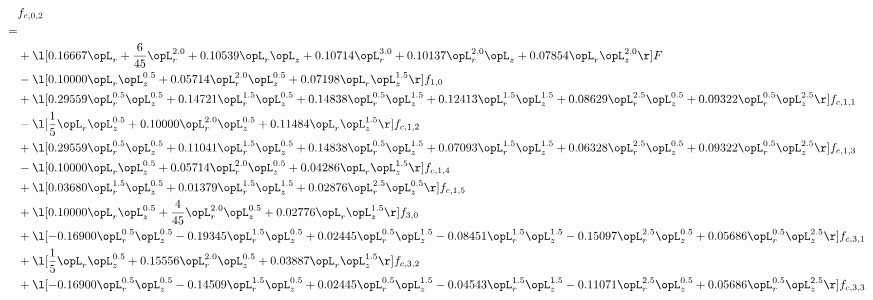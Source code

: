 \begin{alignat}{2} 
\label{eq:f_02_2} 
& f_{c,0,2} \nonumber \\ 
 = \\ 
& + \l[  0.16667 \opL_r + \frac{6}{45} \opL_r^{2.0} +  0.10539 \opL_r \opL_z +  0.10714 \opL_r^{3.0} +  0.10137 \opL_r^{2.0} \opL_z +  0.07854 \opL_r \opL_z^{2.0}  \r] F \nonumber \\ 
& - \l[  0.10000 \opL_r \opL_z^{0.5} +  0.05714 \opL_r^{2.0} \opL_z^{0.5} +  0.07198 \opL_r \opL_z^{1.5}  \r] f_{1,0} \nonumber \\ 
& + \l[  0.29559 \opL_r^{0.5} \opL_z^{0.5} +  0.14721 \opL_r^{1.5} \opL_z^{0.5} +  0.14838 \opL_r^{0.5} \opL_z^{1.5} +  0.12413 \opL_r^{1.5} \opL_z^{1.5} +  0.08629 \opL_r^{2.5} \opL_z^{0.5} +  0.09322 \opL_r^{0.5} \opL_z^{2.5}  \r] f_{c,1,1} \nonumber \\ 
& - \l[ \frac{1}{5} \opL_r \opL_z^{0.5} +  0.10000 \opL_r^{2.0} \opL_z^{0.5} +  0.11484 \opL_r \opL_z^{1.5}  \r] f_{c,1,2} \nonumber \\ 
& + \l[  0.29559 \opL_r^{0.5} \opL_z^{0.5} +  0.11041 \opL_r^{1.5} \opL_z^{0.5} +  0.14838 \opL_r^{0.5} \opL_z^{1.5} +  0.07093 \opL_r^{1.5} \opL_z^{1.5} +  0.06328 \opL_r^{2.5} \opL_z^{0.5} +  0.09322 \opL_r^{0.5} \opL_z^{2.5}  \r] f_{c,1,3} \nonumber \\ 
& - \l[  0.10000 \opL_r \opL_z^{0.5} +  0.05714 \opL_r^{2.0} \opL_z^{0.5} +  0.04286 \opL_r \opL_z^{1.5}  \r] f_{c,1,4} \nonumber \\ 
& + \l[  0.03680 \opL_r^{1.5} \opL_z^{0.5} +  0.01379 \opL_r^{1.5} \opL_z^{1.5} +  0.02876 \opL_r^{2.5} \opL_z^{0.5}  \r] f_{c,1,5} \nonumber \\ 
& + \l[  0.10000 \opL_r \opL_z^{0.5} + \frac{4}{45} \opL_r^{2.0} \opL_z^{0.5} +  0.02776 \opL_r \opL_z^{1.5}  \r] f_{3,0} \nonumber \\ 
& + \l[  -0.16900 \opL_r^{0.5} \opL_z^{0.5}   -0.19345 \opL_r^{1.5} \opL_z^{0.5} +  0.02445 \opL_r^{0.5} \opL_z^{1.5}   -0.08451 \opL_r^{1.5} \opL_z^{1.5}   -0.15097 \opL_r^{2.5} \opL_z^{0.5} +  0.05686 \opL_r^{0.5} \opL_z^{2.5}  \r] f_{c,3,1} \nonumber \\ 
& + \l[ \frac{1}{5} \opL_r \opL_z^{0.5} +  0.15556 \opL_r^{2.0} \opL_z^{0.5} +  0.03887 \opL_r \opL_z^{1.5}  \r] f_{c,3,2} \nonumber \\ 
& + \l[  -0.16900 \opL_r^{0.5} \opL_z^{0.5}   -0.14509 \opL_r^{1.5} \opL_z^{0.5} +  0.02445 \opL_r^{0.5} \opL_z^{1.5}   -0.04543 \opL_r^{1.5} \opL_z^{1.5}   -0.11071 \opL_r^{2.5} \opL_z^{0.5} +  0.05686 \opL_r^{0.5} \opL_z^{2.5}  \r] f_{c,3,3} \nonumber \\ 

\end{alignat}
